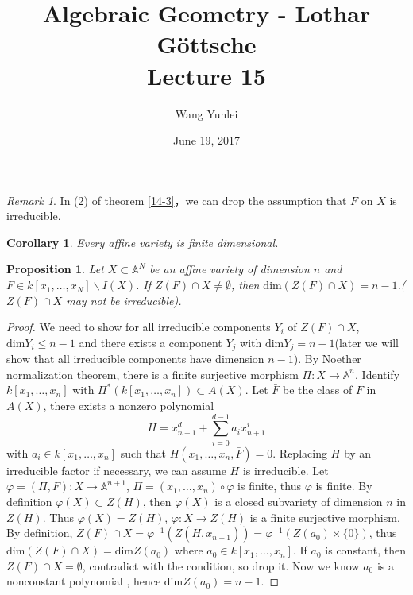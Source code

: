 \documentclass{amsart}
\theoremstyle{plain}
\newtheorem{corollary}{Corollary}
\newtheorem{proposition}{Proposition}
\theoremstyle{definition}
\theoremstyle{remark}
\newtheorem*{remark}{Remark}
\numberwithin{equation}{section}
\begin{document}
\title[Complete-simple distributive lattices]
{Algebraic Geometry - Lothar G\"{o}ttsche \\
	Lecture 15}
\author{Wang Yunlei}
\date{June 19, 2017}
 
\maketitle
\begin{remark}
	In (2) of theorem \ref{14-3}，we can drop the assumption that $ F $ on $ X $ is irreducible.
\end{remark}
\begin{corollary}
	Every affine variety is finite dimensional.
\end{corollary}
\begin{proposition}\label{15-1}
	Let $ X\subset \mathbb{A}^N $ be an affine variety of dimension $ n $ and $ F\in k[x_1,\dots,x_N]\backslash I(X) $. If $ Z(F)\cap X\neq \emptyset $, then $ \text{dim}(Z(F)\cap X)=n-1 $.($ Z(F)\cap X $ may not be irreducible).
\end{proposition}
\begin{proof}
	We need to show for all irreducible components $ Y_i $ of $ Z(F)\cap X $, $ \text{dim} Y_i\leq n-1 $ and there exists a component $ Y_j $ with $ \text{dim}Y_j=n-1 $(later we will show that all irreducible components have dimension $ n-1 $). By Noether normalization theorem, there is a finite surjective morphism $ \Pi:X\to \mathbb{A}^n $. Identify $ k[x_1,\dots,x_n] $ with $ \Pi^\ast(k[x_1,\dots,x_n])\subset A(X) $. Let $ \bar{F} $ be the class of $ F $ in $ A(X) $, there exists a nonzero polynomial 
	$$
	H=x_{n+1}^d + \sum\limits_{i=0}^{d-1}a_ix_{n+1}^i
	$$
	with $ a_i\in k[x_1,\dots,x_n] $ such that $ H(x_1,\dots,x_n,\bar{F})=0 $. Replacing $ H $ by an irreducible  factor if necessary, we can assume $ H $ is  irreducible. Let $ \varphi =(\Pi,F):X\to \mathbb{A}^{n+1} $, $ \Pi = (x_1,\dots,x_n)\circ\varphi $ is finite, thus $ \varphi $ is finite. By definition $ \varphi (X)\subset Z(H) $, then $ \varphi(X) $ is a closed subvariety of dimension $ n $ in $ Z(H) $. Thus $ \varphi(X)=Z(H) $, $ \varphi :X\to Z(H) $ is a finite surjective morphism. By definition, $ Z(F)\cap X= \varphi^{-1}(Z(H,x_{n+1}))=\varphi^{-1}(Z(a_0)\times \lbrace 0\rbrace) $, thus $ \text{dim}(Z(F)\cap X)=\text{dim} Z(a_0) $ where $ a_0\in k[x_1,\dots,x_n] $. If $ a_0 $ is constant, then $ Z(F)\cap X=\emptyset $, contradict with the condition, so drop it. Now we know $ a_0 $ is a nonconstant polynomial , hence $ \text{dim}Z(a_0)=n-1 $.
\end{proof}
\end{document}
